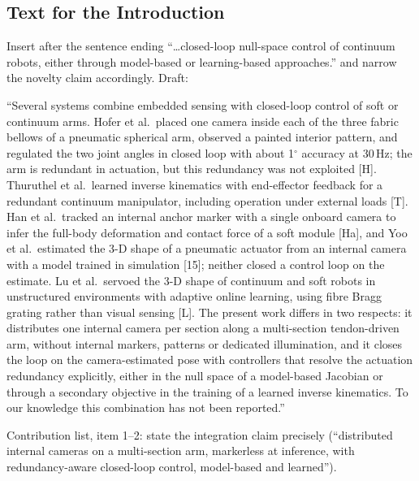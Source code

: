 \documentclass[10pt,a4paper]{article}
\begin{document}
\subsection{Text for the Introduction}
\begin{todo}
Insert after the sentence ending ``\dots closed-loop null-space control of continuum robots, either through model-based or learning-based approaches.'' and narrow the novelty claim accordingly. Draft:

``Several systems combine embedded sensing with closed-loop control of soft or continuum arms. Hofer et al.\ placed one camera inside each of the three fabric bellows of a pneumatic spherical arm, observed a painted interior pattern, and regulated the two joint angles in closed loop with about 1$^\circ$ accuracy at 30\,Hz; the arm is redundant in actuation, but this redundancy was not exploited [H]. Thuruthel et al.\ learned inverse kinematics with end-effector feedback for a redundant continuum manipulator, including operation under external loads [T]. Han et al.\ tracked an internal anchor marker with a single onboard camera to infer the full-body deformation and contact force of a soft module [Ha], and Yoo et al.\ estimated the 3-D shape of a pneumatic actuator from an internal camera with a model trained in simulation [15]; neither closed a control loop on the estimate. Lu et al.\ servoed the 3-D shape of continuum and soft robots in unstructured environments with adaptive online learning, using fibre Bragg grating rather than visual sensing [L]. The present work differs in two respects: it distributes one internal camera per section along a multi-section tendon-driven arm, without internal markers, patterns or dedicated illumination, and it closes the loop on the camera-estimated pose with controllers that resolve the actuation redundancy explicitly, either in the null space of a model-based Jacobian or through a secondary objective in the training of a learned inverse kinematics. To our knowledge this combination has not been reported.''

Contribution list, item 1--2: state the integration claim precisely (``distributed internal cameras on a multi-section arm, markerless at inference, with redundancy-aware closed-loop control, model-based and learned'').
\end{todo}
\end{document}
